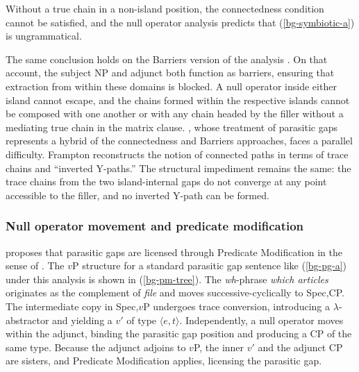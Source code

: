 \documentclass[12pt]{article}
\begin{document}
\ex\label{bg-gproj-tree}
\begin{center}
\end{center}
\xe

\noindent Without a true chain in a non-island position, the connectedness condition cannot be satisfied, and the null operator analysis predicts that (\ref{bg-symbiotic-a}) is ungrammatical.

The same conclusion holds on the Barriers version of the analysis \citep{chomsky1986}. On that account, the subject NP and adjunct both function as barriers, ensuring that extraction from within these domains is blocked. A null operator inside either island cannot escape, and the chains formed within the respective islands cannot be composed with one another or with any chain headed by the filler without a mediating true chain in the matrix clause. \citet{frampton1990}, whose treatment of parasitic gaps represents a hybrid of the connectedness and Barriers approaches, faces a parallel difficulty. Frampton reconstructs the notion of connected paths in terms of trace chains and ``inverted Y-paths.'' The structural impediment remains the same: the trace chains from the two island-internal gaps do not converge at any point accessible to the filler, and no inverted Y-path can be formed.

\subsubsection{Null operator movement and predicate modification}\label{sec:predication}

\citet{nissenbaum2000} proposes that parasitic gaps are licensed through Predicate Modification in the sense of \citet{heim1998}. The $v$P structure for a standard parasitic gap sentence like (\ref{bg-pg-a}) under this analysis is shown in (\ref{bg-pm-tree}). The \emph{wh}-phrase \emph{which articles} originates as the complement of \emph{file} and moves successive-cyclically to Spec,CP. The intermediate copy in Spec,$v$P undergoes trace conversion, introducing a $\lambda$-abstractor and yielding a $v'$ of type $\langle e,t \rangle$. Independently, a null operator moves within the adjunct, binding the parasitic gap position and producing a CP of the same type. Because the adjunct adjoins to $v$P, the inner $v'$ and the adjunct CP are sisters, and Predicate Modification applies, licensing the parasitic gap.
\end{document}
